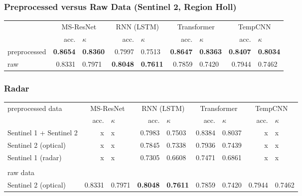 \documentclass[%
  aspectratio=169,
  9pt,
ngerman,
  light,
  mathserif,
  professionalfont,
  affiliationintitlepagehead,
  titlegraphic,
   affiliation,
   navigationbar,
  progressbar,
]{beamer}
\begin{document}
{\begin{frame}
	
	
	
	
\end{frame}

\begin{frame}
\frametitle{Preprocessed versus Raw Data (Sentinel 2, Region Holl)}

\begin{tabular}{lrlrlrlrl}
	\toprule
	& \multicolumn{2}{c}{MS-ResNet} & \multicolumn{2}{c}{RNN (LSTM)} & \multicolumn{2}{c}{Transformer} & \multicolumn{2}{c}{TempCNN} \\
	& acc. & $\kappa$ & acc. & $\kappa$ & acc. & $\kappa$ & acc. & $\kappa$ \\
	\cmidrule(lr){2-3}\cmidrule(lr){4-5} \cmidrule(lr){6-7}\cmidrule(lr){8-9}
	preprocessed & \textbf{0.8654} & \textbf{0.8360} & 0.7997 & 0.7513 & \textbf{0.8647} & \textbf{0.8363} & \textbf{0.8407} & \textbf{0.8034} \\
	raw 		 & 0.8331 & 0.7971 & \textbf{0.8048} & \textbf{0.7611} & 0.7859 & 0.7420 & 0.7944 & 0.7462 \\
	\bottomrule
\end{tabular}

\end{frame}

\begin{frame}
\frametitle{Radar}

\begin{tabular}{lrlrlrlrl}
	\toprule
	preprocessed data& \multicolumn{2}{c}{MS-ResNet} & \multicolumn{2}{c}{RNN (LSTM)} & \multicolumn{2}{c}{Transformer} & \multicolumn{2}{c}{TempCNN} \\
	& acc. & $\kappa$ & acc. & $\kappa$ & acc. & $\kappa$ & acc. & $\kappa$ \\
	\cmidrule(lr){2-3}\cmidrule(lr){4-5} \cmidrule(lr){6-7}\cmidrule(lr){8-9}
	Sentinel 1 + Sentinel 2 	& x & x & 0.7983 & 0.7503 & 0.8384 & 0.8037 & x & x \\
	Sentinel 2 (optical)	 	& x & x & 0.7845 & 0.7338 & 0.7936 & 0.7439 & x & x \\
	Sentinel 1 (radar)		 	& x & x & 0.7305 & 0.6608 & 0.7471 & 0.6861 & x & x \\
	\midrule \\
	raw data \\
	Sentinel 2 (optical) & 0.8331 & 0.7971 & \textbf{0.8048} & \textbf{0.7611} & 0.7859 & 0.7420 & 0.7944 & 0.7462 \\
\end{tabular}


\end{frame}}
\end{document}
